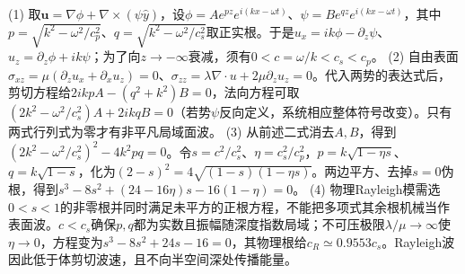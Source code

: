 (1) 取\(\boldsymbol u=\nabla\phi+\nabla\times(\psi\hat y)\)，设\(\phi=Ae^{pz}e^{i(kx-\omega t)}\)、\(\psi=Be^{qz}e^{i(kx-\omega t)}\)，其中\(p=\sqrt{k^2-\omega^2/c_p^2}\)、\(q=\sqrt{k^2-\omega^2/c_s^2}\)取正实根。于是\(u_x=ik\phi-\partial_z\psi\)、\(u_z=\partial_z\phi+ik\psi\)；为了向\(z\to-\infty\)衰减，须有\(0<c=\omega/k<c_s<c_p\)。
(2) 自由表面\(\sigma_{xz}=\mu(\partial_zu_x+\partial_xu_z)=0\)、\(\sigma_{zz}=\lambda\nabla\cdot u+2\mu\partial_zu_z=0\)。代入两势的表达式后，剪切方程给\(2ikpA-(q^2+k^2)B=0\)，法向方程可取\((2k^2-\omega^2/c_s^2)A+2ikqB=0\)（若势\(\psi\)反向定义，系统相应整体符号改变）。只有两式行列式为零才有非平凡局域面波。
(3) 从前述二式消去\(A,B\)，得到\((2k^2-\omega^2/c_s^2)^2-4k^2pq=0\)。令\(s=c^2/c_s^2\)、\(\eta=c_s^2/c_p^2\)，\(p=k\sqrt{1-\eta s}\)、\(q=k\sqrt{1-s}\)，化为\((2-s)^2=4\sqrt{(1-s)(1-\eta s)}\)。两边平方、去掉\(s=0\)伪根，得到\(s^3-8s^2+(24-16\eta)s-16(1-\eta)=0\)。
(4) 物理Rayleigh模需选\(0<s<1\)的非零根并同时满足未平方的正根方程，不能把多项式其余根机械当作表面波。\(c<c_s\)确保\(p,q\)都为实数且振幅随深度指数局域；不可压极限\(\lambda/\mu\to\infty\)使\(\eta\to0\)，方程变为\(s^3-8s^2+24s-16=0\)，其物理根给\(c_R\simeq0.9553c_s\)。Rayleigh波因此低于体剪切波速，且不向半空间深处传播能量。
